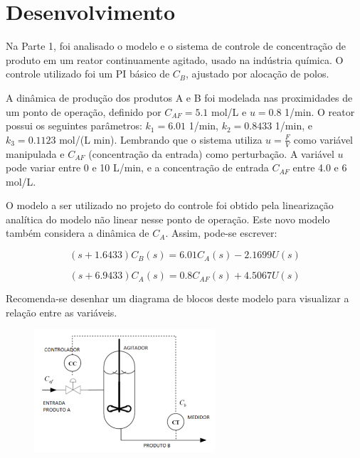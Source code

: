 \documentclass[a4paper,12pt]{article}
\begin{document}
\section{Desenvolvimento}
\label{chap:desenvolvimento}

Na Parte 1, foi analisado o modelo e o sistema de controle de concentração de produto em um reator continuamente agitado, usado na indústria química. O controle utilizado foi um PI básico de \(C_B\), ajustado por alocação de polos.

A dinâmica de produção dos produtos A e B foi modelada nas proximidades de um ponto de operação, definido por \(C_{AF} = 5.1\) mol/L e \(u = 0.8\) 1/min. O reator possui os seguintes parâmetros: \(k_1 = 6.01\) 1/min, \(k_2 = 0.8433\) 1/min, e \(k_3 = 0.1123\) mol/(L min). Lembrando que o sistema utiliza \(u = \frac{F}{V}\) como variável manipulada e \(C_{AF}\) (concentração da entrada) como perturbação. A variável \(u\) pode variar entre 0 e 10 L/min, e a concentração de entrada \(C_{AF}\) entre 4.0 e 6 mol/L.

O modelo a ser utilizado no projeto do controle foi obtido pela linearização analítica do modelo não linear nesse ponto de operação. Este novo modelo também considera a dinâmica de \(C_A\). Assim, pode-se escrever:

\begin{equation}
(s + 1.6433) C_B(s) = 6.01 C_A(s) - 2.1699 U(s)
\end{equation}

\begin{equation}
(s + 6.9433) C_A(s) = 0.8 C_{AF}(s) + 4.5067 U(s)
\end{equation}

Recomenda-se desenhar um diagrama de blocos deste modelo para visualizar a relação entre as variáveis.

 \begin{figure}[ht]
  \centering
  \includegraphics[width=0.6\textwidth]{Imagens/Reator.png}
  \end{figure}
\end{document}
